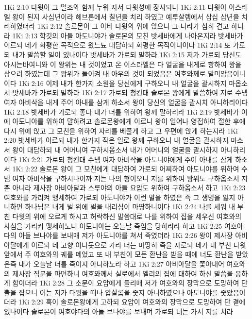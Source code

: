 1Ki 2:10  다윗이 그 열조와 함께 누워 자서 다윗성에 장사되니
1Ki 2:11  다윗이 이스라엘 왕이 된지 사십년이라 헤브론에서 칠년을 치리 하였고 예루살렘에서 삼십 삼년을 치리하였더라
1Ki 2:12  솔로몬이 그 아비 다윗의 위에 앉으니 그 나라가 심히 견고 하니라
1Ki 2:13  학깃의 아들 아도니야가 솔로몬의 모친 밧세바에게 나아온지라 밧세바가 이르되 네가 화평한 목적으로 왔느뇨 대답하되 화평한 목적이니이다
1Ki 2:14  또 가로되 내가 말씀할 일이 있나이다 밧세바가 가로되 말하라
1Ki 2:15  저가 가로되 당신도 아시는바여니와 이 왕위는 내 것이었고 온 이스라엘은 다 얼굴을 내게로 향하여 왕을 삼으려 하였는데 그 왕위가 돌이켜 내 아우의 것이 되었음은 여호와께로 말미암음이니이다
1Ki 2:16  이제 내가 한가지 소원을 당신에게 구하오니 내 얼굴을 괄시하지 마옵소서 밧세바가 가로되 말하라
1Ki 2:17  가로되 청컨대 솔로몬 왕에게 말씀하여 저로 수넴 여자 아비삭을 내게 주어 아내를 삼게 하소서 왕이 당신의 얼굴을 괄시치 아니하리이다
1Ki 2:18  밧세바가 가로되 좋다 내가 너를 위하여 왕께 말하리라
1Ki 2:19  밧세바가 이에 아도니야를 위하여 말하려고 솔로몬왕에게 이르니 왕이 일어나 영접하여 절한 후에 다시 위에 앉고 그 모친을 위하여 자리를 베풀게 하고 그 우편에 앉게 하는지라
1Ki 2:20  밧세바가 이르되 내가 한가지 작은 일로 왕께 구하오니 내 얼굴을 괄시하지 마소서 왕이 대답하되 내 어머니여 구하시옵소서 내가 어머니의 얼굴을 괄시하지 아니하리이다
1Ki 2:21  가로되 청컨대 수넴 여자 아비삭을 아도니야에게 주어 아내를 삼게 하소서
1Ki 2:22  솔로몬 왕이 그 모친에게 대답하여 가로되 어찌하여 아도니야를 위하여 수넴 여자 아비삭을 구하시나이까 저는 나의 형이오니 저를 위하여 왕위도 구하옵소서 저뿐 아니라 제사장 아비아달과 스루야의 아들 요압도 위하여 구하옵소서 하고
1Ki 2:23  여호와를 가리켜 맹세하여 가로되 아도니야가 이런 말을 하였은 즉 그 생명을 잃지 아니하면 하나님은 내게 벌 위에 벌을 내리심이 마땅하니이다
1Ki 2:24  나를 세워 내 부친 다윗의 위에 오르게 하시고 허락하신 말씀대로 나를 위하여 집을 세우신 여호와의 사심을 가리켜 맹세하노니 아도니야는 오늘날 죽임을 당하리라 하고
1Ki 2:25  여호야다의 아들 브나야를 보내매 저가 아도니야를 쳐서 죽였더라
1Ki 2:26  왕이 제사장 아비아달에게 이르되 네 고향 아나돗으로 가라 너는 마땅히 죽을 자로되 네가 내 부친 다윗 앞에서 주 여호와의 궤를 메었고 또 내 부친이 모든 환난을 받을 때에 너도 환난을 받았은즉 내가 오늘날 너를 죽이지 아니하노라 하고
1Ki 2:27  아비아달을 쫓아내어 여호와의 제사장 직분을 파면하니 여호와께서 실로에서 엘리의 집에 대하여 하신 말씀을 응하게 함이더라
1Ki 2:28  그 소문이 요압에게 들리매 저가 여호와의 장막으로 도망하여 단뿔을 잡으니 이는 저가 다윗을 떠나 압살롬을 좇지 아니하였으나 아도니야를 좇았음이더라
1Ki 2:29  혹이 솔로몬왕에게 고하되 요압이 여호와의 장막으로 도망하여 단 곁에 있나이다 솔로몬이 여호야다의 아들 브나야를 보내며 가로되 너는 가서 저를 치라
